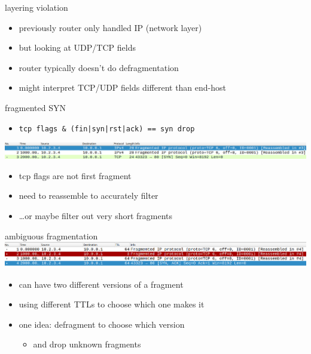 \begin{frame}{layering violation}
    \begin{itemize}
    \item previously router only handled IP (network layer)
    \item but looking at UDP/TCP fields
    \vspace{.5cm}
    \item router typically doesn't do defragmentation
    \item might interpret TCP/UDP fields different than end-host
    \end{itemize}
\end{frame}

\begin{frame}[fragile]{fragmented SYN}
    \begin{itemize}
    \item \verb^tcp flags & (fin|syn|rst|ack) == syn drop^
    \end{itemize}
\includegraphics[width=\textwidth]{../fire/tcp-syn-frag}
    \begin{itemize}
    \item tcp flags are not first fragment
    \item need to reassemble to accurately filter
    \item \ldots or maybe filter out very short fragments
    \end{itemize}
\end{frame}

\begin{frame}[fragile]{ambiguous fragmentation}
\includegraphics[width=\textwidth]{../fire/tcp-syn-ambig-frag}
    \begin{itemize}
    \item can have two different versions of a fragment
    \item using different TTLs to choose which one makes it
    \vspace{.5cm}
    \item one idea: defragment to choose which version 
        \begin{itemize}
        \item and drop unknown fragments
        \end{itemize}
    \end{itemize}
\end{frame}

